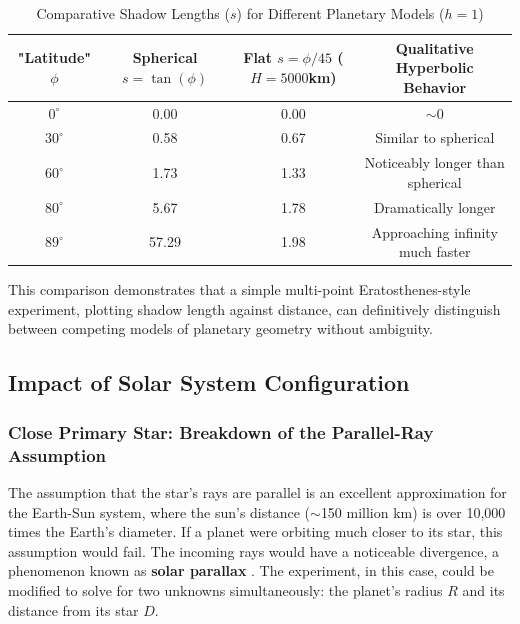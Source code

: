 \documentclass[11pt]{article}
\begin{document}
\begin{table}[htbp]
\centering
\caption{Comparative Shadow Lengths ($s$) for Different Planetary Models ($h=1$)}
\label{tab:model_comparison}
\small
\begin{tabular}{@{}cccc@{}}
\toprule
\textbf{"Latitude" $\phi$} & \textbf{Spherical $s = \tan(\phi)$} & \textbf{Flat $s = \phi/45$ ($H=5000$km)} & \textbf{Qualitative Hyperbolic Behavior} \\
\midrule
\textbf{$0^{\circ}$} & 0.00 & 0.00 & $\sim$0 \\
\textbf{$30^{\circ}$} & 0.58 & 0.67 & Similar to spherical \\
\textbf{$60^{\circ}$} & 1.73 & 1.33 & Noticeably longer than spherical \\
\textbf{$80^{\circ}$} & 5.67 & 1.78 & Dramatically longer \\
\textbf{$89^{\circ}$} & 57.29 & 1.98 & Approaching infinity much faster \\
\bottomrule
\end{tabular}
\end{table}

This comparison demonstrates that a simple multi-point Eratosthenes-style experiment, plotting shadow length against distance, can definitively distinguish between competing models of planetary geometry without ambiguity.

\subsection{Impact of Solar System Configuration}

\subsubsection{Close Primary Star: Breakdown of the Parallel-Ray Assumption}
The assumption that the star's rays are parallel is an excellent approximation for the Earth-Sun system, where the sun's distance ($\sim$150 million km) is over 10,000 times the Earth's diameter. If a planet were orbiting much closer to its star, this assumption would fail. The incoming rays would have a noticeable divergence, a phenomenon known as \textbf{solar parallax} \cite{Anderson1999}. The experiment, in this case, could be modified to solve for two unknowns simultaneously: the planet's radius $R$ and its distance from its star $D$.
\end{document}
